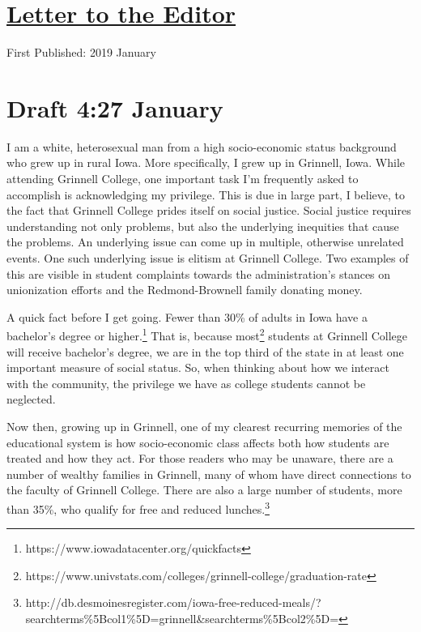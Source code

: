 \documentclass[12pt]{article}[titlepage]
\newcommand{\1}{\={a}}
\newcommand{\2}{\={e}}
\newcommand{\3}{\={\i}}
\newcommand{\4}{\=o}
\newcommand{\5}{\=u}
\newcommand{\6}{\={A}}
\renewcommand{\,}{\textsuperscript{,}}
\begin{document}
\doublespacing
\section{\href{letter-to-the-editor.html}{Letter to the Editor}}
First Published: 2019 January
\section{Draft 4:27 January}
I am a white, heterosexual man from a high socio-economic status background who grew up in rural Iowa.
More specifically, I grew up in Grinnell, Iowa.
While attending Grinnell College, one important task I'm frequently asked to accomplish is acknowledging my privilege.
This is due in large part, I believe, to the fact that Grinnell College prides itself on social justice.
Social justice requires understanding not only problems, but also the underlying inequities that cause the problems.
An underlying issue can come up in multiple, otherwise unrelated events.
One such underlying issue is elitism at Grinnell College.
Two examples of this are visible in student complaints towards the administration's stances on unionization efforts and the Redmond-Brownell family donating money.

A quick fact before I get going.
Fewer than 30\% of adults in Iowa have a bachelor's degree or higher.\footnote{https://www.iowadatacenter.org/quickfacts}
That is, because most\footnote{https://www.univstats.com/colleges/grinnell-college/graduation-rate} students at Grinnell College will receive bachelor's degree, we are in the top third of the state in at least one important measure of social status.
So, when thinking about how we interact with the community, the privilege we have as college students cannot be neglected.

Now then, growing up in Grinnell, one of my clearest recurring memories of the educational system is how socio-economic class affects both how students are treated and how they act.
For those readers who may be unaware, there are a number of wealthy families in Grinnell, many of whom have direct connections to the faculty of Grinnell College.
There are also a large number of students, more than 35\%, who qualify for free and reduced lunches.\footnote{http://db.desmoinesregister.com/iowa-free-reduced-meals/?searchterms\%5Bcol1\%5D=grinnell&searchterms\%5Bcol2\%5D=}
\end{document}
